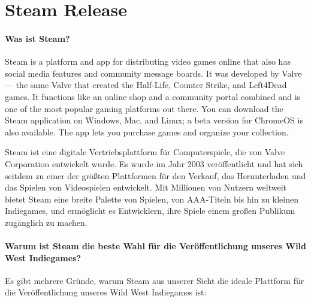 
\chapter{Steam Release}\label{ch:steamrelease}
\renewcommand{\kapitelautor}{Autor: Nils Hubmann} %

%
\subsubsection{Was ist Steam?}\label{subsubsec:Steam-Vorstellung}

\begin{coolQuote}
Steam is a platform and app for distributing video games online that also has social media features and community message boards.
It was developed by Valve — the same Valve that created the Half-Life, Counter Strike, and Left4Dead games.
It functions like an online shop and a community portal combined and is one of the most popular gaming platforms out there.
You can download the Steam application on Windows, Mac, and Linux; a beta version for ChromeOS is also available.
The app lets you purchase games and organize your collection.
\end{coolQuote}

Steam ist eine digitale Vertriebsplattform für Computerspiele, die von Valve Corporation entwickelt wurde.
Es wurde im Jahr 2003 veröffentlicht und hat sich seitdem zu einer der größten Plattformen für den Verkauf, das Herunterladen und das Spielen von Videospielen entwickelt.
Mit Millionen von Nutzern weltweit bietet Steam eine breite Palette von Spielen, von AAA-Titeln bis hin zu kleinen Indiegames, und ermöglicht es Entwicklern, ihre Spiele einem großen Publikum zugänglich zu machen.

\subsubsection{Warum ist Steam die beste Wahl für die Veröffentlichung unseres Wild West Indiegames?}\label{subsubsec:Warum-Steam}

Es gibt mehrere Gründe, warum Steam aus unserer Sicht die ideale Plattform für die Veröffentlichung unseres Wild West Indiegames ist:

